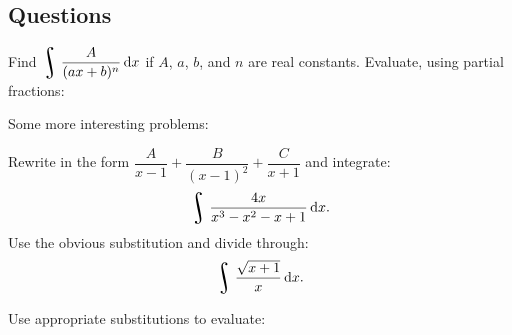 \subsection*{Questions}
\begin{questions}
  \questioS Find $ \displaystyle\rint \dfrac{A}{(ax + b)^n} \dif{x} $ if $ A $, $ a $, $ b $, and $ n $ are real constants.
  \questioS Evaluate, using partial fractions:
  \question Some more interesting problems:
      \begin{parts}
        \parS Rewrite in the form $ \dfrac{A}{x-1} + \dfrac{B}{(x-1)^2} + \dfrac{C}{x + 1} $ and integrate:
          \begin{displaymath}
            \rint \dfrac{4x}{x^3 - x^2 - x + 1} \dif{x}.
          \end{displaymath}
        \parS Use the obvious substitution and divide through:
          \begin{displaymath}
            \rint \dfrac{\sqrt{x+1}}{x} \dif{x}.
          \end{displaymath}
      \end{parts}
  \questioS Use appropriate substitutions to evaluate:
    \begin{parts}

\end{parts}
\end{questions}
